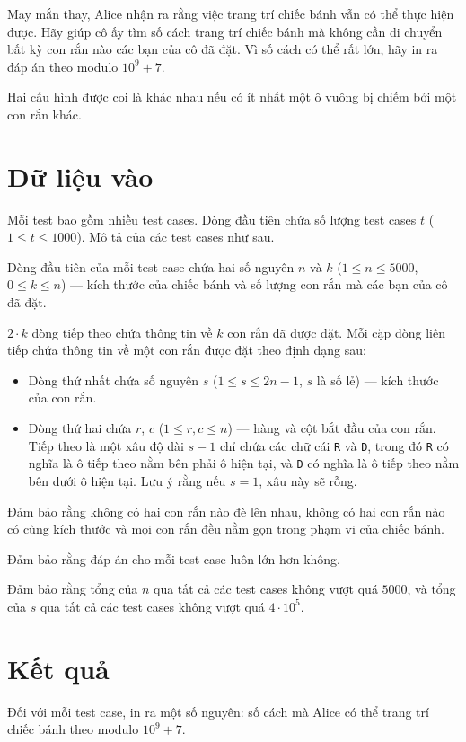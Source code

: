 \documentclass[12pt,a4paper]{article}
\begin{document}
May mắn thay, Alice nhận ra rằng việc trang trí chiếc bánh vẫn có thể thực hiện được. Hãy giúp cô ấy tìm số cách trang trí chiếc bánh mà không cần di chuyển bất kỳ con rắn nào các bạn của cô đã đặt. Vì số cách có thể rất lớn, hãy in ra đáp án theo modulo $10^9 + 7$.

Hai cấu hình được coi là khác nhau nếu có ít nhất một ô vuông bị chiếm bởi một con rắn khác.

\section*{Dữ liệu vào}
Mỗi test bao gồm nhiều test cases. Dòng đầu tiên chứa số lượng test cases $t$ ($1 \le t \le 1000$). Mô tả của các test cases như sau.

Dòng đầu tiên của mỗi test case chứa hai số nguyên $n$ và $k$ ($1 \le n \le 5000$, $0 \le k \le n$) — kích thước của chiếc bánh và số lượng con rắn mà các bạn của cô đã đặt.

$2 \cdot k$ dòng tiếp theo chứa thông tin về $k$ con rắn đã được đặt. Mỗi cặp dòng liên tiếp chứa thông tin về một con rắn được đặt theo định dạng sau:
\begin{itemize}
    \item Dòng thứ nhất chứa số nguyên $s$ ($1 \le s \le 2n-1$, $s$ là số lẻ) — kích thước của con rắn.
    \item Dòng thứ hai chứa $r$, $c$ ($1 \le r, c \le n$) — hàng và cột bắt đầu của con rắn. Tiếp theo là một xâu độ dài $s-1$ chỉ chứa các chữ cái \texttt{R} và \texttt{D}, trong đó \texttt{R} có nghĩa là ô tiếp theo nằm bên phải ô hiện tại, và \texttt{D} có nghĩa là ô tiếp theo nằm bên dưới ô hiện tại. Lưu ý rằng nếu $s = 1$, xâu này sẽ rỗng.
\end{itemize}

Đảm bảo rằng không có hai con rắn nào đè lên nhau, không có hai con rắn nào có cùng kích thước và mọi con rắn đều nằm gọn trong phạm vi của chiếc bánh.

Đảm bảo rằng đáp án cho mỗi test case luôn lớn hơn không.

Đảm bảo rằng tổng của $n$ qua tất cả các test cases không vượt quá $5000$, và tổng của $s$ qua tất cả các test cases không vượt quá $4 \cdot 10^5$.

\section*{Kết quả}
Đối với mỗi test case, in ra một số nguyên: số cách mà Alice có thể trang trí chiếc bánh theo modulo $10^9 + 7$.
\end{document}
